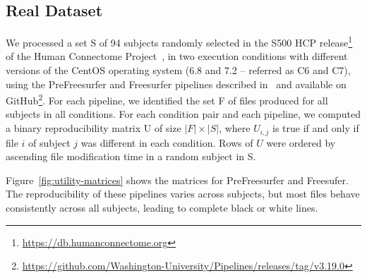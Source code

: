 \documentclass[10pt, conference, compsocconf]{IEEEtran}
\begin{document}
\subsection{Real Dataset}

We
processed a set S of 94 subjects randomly selected in the S500 HCP 
release\footnote{\url{https://db.humanconnectome.org}} of the Human 
Connectome Project~\cite{glasser2013minimal}, in two execution 
conditions with different versions of the CentOS operating system 
(6.8 and 7.2 -- referred as C6 and C7), using the 
PreFreesurfer and Freesurfer pipelines described 
in~\cite{glasser2013minimal} and available on 
GitHub\footnote{\url{https://github.com/Washington-University/Pipelines/releases/tag/v3.19.0}}. 
For each pipeline, we identified the set F of files produced for all 
subjects in all conditions. For each condition pair and each pipeline, 
we computed a binary reproducibility matrix U of size $|F|\times|S|$, 
where $U_{i,j}$ is true if and only if file $i$ of subject $j$ was 
different in each condition. Rows of $U$ were ordered by ascending file 
modification time in a random subject in S.

Figure~\ref{fig:utility-matrices} shows the matrices
for PreFreesurfer and Freesufer. The
reproducibility of these pipelines varies across subjects,
but most files behave
consistently across all subjects, leading to complete black or white
lines.
\end{document}
